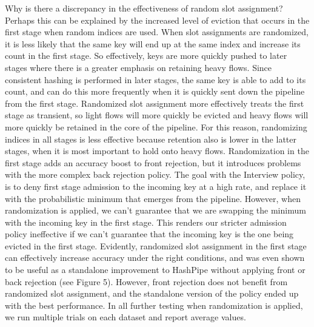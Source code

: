 Why is there a discrepancy in the effectiveness of random slot assignment? Perhaps this can be explained by the increased level of eviction that occurs in the first stage when random indices are used. When slot assignments are randomized, it is less likely that the same key will end up at the same index and increase its count in the first stage. So effectively, keys are more quickly pushed to later stages where there is a greater emphasis on retaining heavy flows. Since consistent hashing is performed in later stages, the same key is able to add to its count, and can do this more frequently when it is quickly sent down the pipeline from the first stage. Randomized slot assignment more effectively treats the first stage as transient, so light flows will more quickly be evicted and heavy flows will more quickly be retained in the core of the pipeline. For this reason, randomizing indices in all stages is less effective because retention also is lower in the latter stages, when it is most important to hold onto heavy flows. Randomization in the first stage adds an accuracy boost to front rejection, but it introduces problems with the more complex back rejection policy. The goal with the Interview policy, is to deny first stage admission to the incoming key at a high rate, and replace it with the probabilistic minimum that emerges from the pipeline. However, when randomization is applied, we can't guarantee that we are swapping the minimum with the incoming key in the first stage. This renders our stricter admission policy ineffective if we can't guarantee that the incoming key is the one being evicted in the first stage. Evidently, randomized slot assignment in the first stage can effectively increase accuracy under the right conditions, and was even shown to be useful as a standalone improvement to HashPipe without applying front or back rejection (see Figure 5). However, front rejection does not benefit from randomized slot assignment, and the standalone version of the policy ended up with the best performance. In all further testing when randomization is applied, we run multiple trials on each dataset and report average values.
